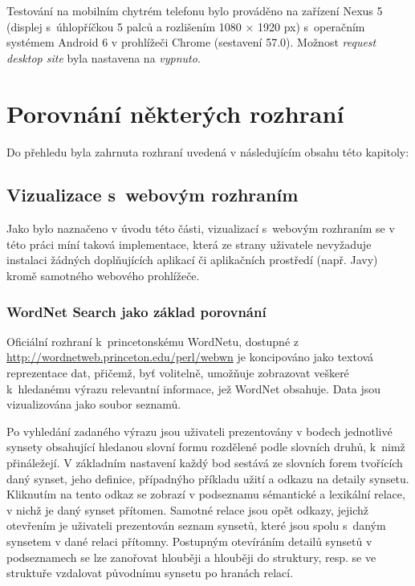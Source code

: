 \documentclass[a4paper, 11pt, oneside, showtrims]{book}
\begin{document}
				Testování na mobilním chytrém telefonu bylo prováděno na zařízení Nexus 5 (displej s~úhlopříčkou 5 palců a rozlišením 1080 × 1920 px) s~operačním systémem Android 6 v prohlížeči Chrome (sestavení 57.0). Možnost \textit{request desktop site} byla nastavena na \textit{vypnuto}.

		\chapter{Porovnání některých rozhraní}
		\label{cha:porovnani}
			
			Do přehledu byla zahrnuta rozhraní uvedená v následujícím obsahu této kapitoly:

			\minitoc %

			

			\section{Vizualizace s~webovým rozhraním}

				Jako bylo naznačeno v úvodu této části, vizualizací s~webovým rozhraním se v této práci míní taková implementace, která ze strany uživatele nevyžaduje instalaci žádných doplňujících aplikací či aplikačních prostředí (např. Javy) kromě samotného webového prohlížeče.

				\subsection{WordNet Search jako základ porovnání}
				\label{wnvis:wnsearch}

					Oficiální rozhraní k~princetonskému WordNetu, dostupné z \url{http://wordnetweb.princeton.edu/perl/webwn} je koncipováno jako textová reprezentace dat, přičemž, byť volitelně, umožňuje zobrazovat veškeré k~hledanému výrazu relevantní informace, jež WordNet obsahuje. Data jsou vizualizována jako soubor seznamů.

					Po vyhledání zadaného výrazu jsou uživateli prezentovány v bodech jednotlivé synsety obsahující hledanou slovní formu rozdělené podle slovních druhů, k~nimž přináležejí. V základním nastavení každý bod sestává ze slovních forem tvořících daný synset, jeho definice, případnýho příkladu užití a odkazu na detaily synsetu. Kliknutím na tento odkaz se zobrazí v podseznamu sémantické a lexikální relace, v nichž je daný synset přítomen. Samotné relace jsou opět odkazy, jejichž otevřením je uživateli prezentován seznam synsetů, které jsou spolu s~daným synsetem v dané relaci přítomny. Postupným otevíráním detailů synsetů v podseznamech se lze zanořovat hlouběji a hlouběji do struktury, resp. se ve struktuře vzdalovat původnímu synsetu po hranách relací.
\end{document}
